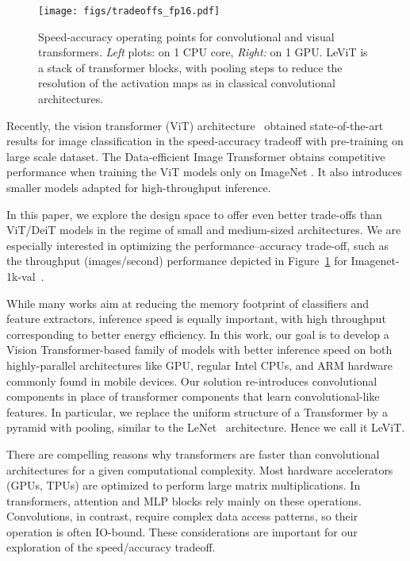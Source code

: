 \documentclass[10pt,twocolumn,letterpaper]{article}
\begin{document}
\begin{figure}
\hspace*{-7mm}\texttt{[image: figs/tradeoffs\_fp16.pdf]}
\caption{\label{fig:mainspeedaccuracyplot}
Speed-accuracy operating points for convolutional and visual transformers. 
	\emph{Left} plots: on 1 CPU core, \emph{Right:} on 1 GPU.
	 LeViT is a stack of transformer blocks, with pooling steps to reduce the resolution of the activation maps as in classical convolutional architectures. 
}
\end{figure}


Recently, the vision transformer (ViT) architecture~\cite{dosovitskiy2020image} obtained state-of-the-art results for image classification in the speed-accuracy tradeoff with pre-training on large scale dataset. The Data-efficient Image Transformer \cite{Touvron2021DeiT} obtains competitive performance when training the ViT models only on ImageNet \cite{deng2009imagenet}. It also introduces smaller models adapted for high-throughput  inference.


In this paper, we explore the design space to offer even better trade-offs than ViT/DeiT models in the regime of small and medium-sized architectures. We are especially interested in optimizing the performance--accuracy trade-off, such as the throughput (images/second) performance depicted in Figure~\ref{fig:mainspeedaccuracyplot} for Imagenet-1k-val~\cite{Russakovsky2015ImageNet12}. 

While many works \cite{Han2015DeepCC,courbariaux2016binaryconnect,zhou2018dorefanet,wang2019haq,stock2020bit} aim at reducing the memory footprint of classifiers and feature extractors, inference speed is equally important, with high throughput corresponding to better energy efficiency.
In this work, our goal is to develop a Vision Transformer-based family of models with better inference speed on both highly-parallel architectures like GPU, regular Intel CPUs, and ARM hardware commonly found in mobile devices. 
Our solution re-introduces convolutional components in place of transformer components that learn convolutional-like features. 
In particular, we replace the uniform structure of a Transformer by a pyramid with pooling, similar to the LeNet~\cite{lecun1989backpropagation} architecture. Hence we call it LeViT. 

There are compelling reasons why transformers are faster than convolutional architectures for a given computational complexity. 
Most hardware accelerators (GPUs, TPUs) are optimized to perform large matrix multiplications.
In transformers, attention and MLP blocks rely mainly on these operations. 
Convolutions, in contrast, require complex data access patterns, so their operation is often IO-bound.
These considerations are important for our exploration of the speed/accuracy tradeoff.  
\end{document}
